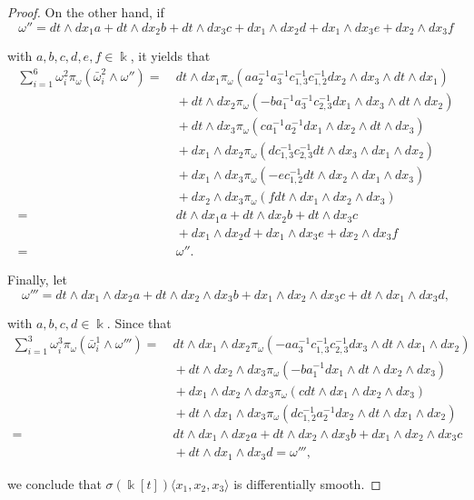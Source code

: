 \documentclass{amsart}
\theoremstyle{definition}
\theoremstyle{remark}
\numberwithin{equation}{section}
\begin{document}
\begin{proof}
On the other hand, if 
\[
\omega'' = dt\wedge dx_1a+dt\wedge dx_2 b+dt\wedge dx_3 c+dx_1\wedge dx_2d+dx_1\wedge dx_3e+dx_2\wedge dx_3f 
\]

with $a,b,c,d,e,f \in \Bbbk$, it yields that 
\begin{align*}
\sum_{i=1}^{6}\omega_{i}^{2}\pi_{\omega}(\bar{\omega}_i^{2}\wedge \omega'') = &\ dt\wedge dx_1\pi_{\omega}(aa_2^{-1}a_{3}^{-1}c_{1,3}^{-1}c_{1,2}^{-1}dx_2\wedge dx_3\wedge dt\wedge dx_1) \\
    &\ + dt\wedge dx_2\pi_{\omega}(-ba_1^{-1}a_3^{-1}c_{2,3}^{-1}dx_1\wedge dx_3\wedge dt\wedge dx_2) \\
    &\ +dt\wedge dx_3\pi_{\omega}(ca_1^{-1}a_2^{-1}dx_1\wedge dx_2\wedge dt\wedge dx_3) \\
    &\ +dx_1\wedge dx_2\pi_{\omega}(dc_{1,3}^{-1}c_{2,3}^{-1}dt\wedge dx_3\wedge dx_1\wedge dx_2) \\
    &\ +dx_1\wedge dx_3\pi_{\omega}(-ec_{1,2}^{-1}dt\wedge dx_2\wedge dx_1\wedge dx_3) \\
    &\ +dx_2\wedge dx_3\pi_{\omega}(fdt\wedge dx_1\wedge dx_2\wedge dx_3) \\
    = &\ dt\wedge dx_1a+dt\wedge dx_2 b+dt\wedge dx_3 c \\
    &\ + dx_1\wedge dx_2d+dx_1\wedge dx_3e+dx_2\wedge dx_3f \\
    = &\ \omega''.
\end{align*}

Finally, let 
\[
\omega''' = dt\wedge dx_1\wedge dx_2 a+dt\wedge dx_2 \wedge dx_3 b+dx_1\wedge dx_2 \wedge dx_3 c+dt\wedge dx_1 \wedge dx_3 d,
\]

with $a, b, c, d \in \Bbbk$. Since that 
\begin{align*}
\sum_{i=1}^{3}\omega_{i}^{3}\pi_{\omega}(\bar{\omega}_i^{1}\wedge \omega''') = &\ dt\wedge dx_1\wedge dx_2 \pi_{\omega}(-aa_{3}^{-1}c_{1,3}^{-1}c_{2,3}^{-1}dx_3\wedge dt\wedge dx_1\wedge dx_2) \\
    &\ + dt\wedge dx_2 \wedge dx_3\pi_{\omega}(-ba_1^{-1}dx_1\wedge dt\wedge dx_2 \wedge dx_3 )\\
    &\ +dx_1\wedge dx_2 \wedge dx_3\pi_{\omega}(cdt\wedge dx_1\wedge dx_2 \wedge dx_3) \\
    &\ +dt\wedge dx_1 \wedge dx_3\pi_{\omega}(dc_{1,2}^{-1}a_2^{-1}dx_2\wedge dt\wedge dx_1 \wedge dx_2) \\
    = &\ dt\wedge dx_1\wedge dx_2 a+dt\wedge dx_2 \wedge dx_3 b+dx_1\wedge dx_2 \wedge dx_3 c \\
    &\ +dt\wedge dx_1 \wedge dx_3 d = \omega''', 
\end{align*}

we conclude that $\sigma(\Bbbk[t])\langle x_1, x_2, x_3\rangle$ is differentially smooth.
\end{proof}
\end{document}
